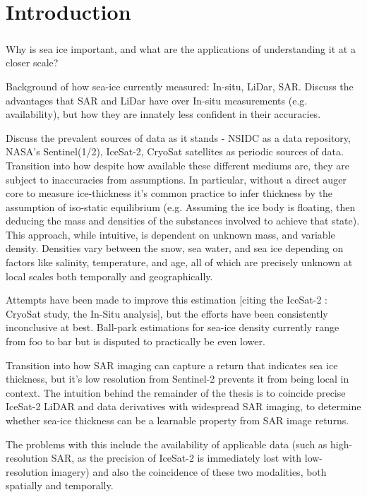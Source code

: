\chapter{Introduction}
\label{sec:Introduction}

\paragraph{}
Why is sea ice important, and what are the applications of understanding it at a closer scale?

Background of how sea-ice currently measured: In-situ, LiDar, SAR. Discuss the advantages that SAR and LiDar have over In-situ measurements (e.g. availability), but how they are innately less confident in their accuracies.

Discuss the prevalent sources of data as it stands - NSIDC as a data repository, NASA's Sentinel(1/2), IceSat-2, CryoSat satellites as periodic sources of data. Transition into how despite how available these different mediums are, they are subject to inaccuracies from assumptions. In particular, without a direct auger core to measure ice-thickness it's common practice to infer thickness by the assumption of iso-static equilibrium (e.g. Assuming the ice body is floating, then deducing the mass and densities of the substances involved to achieve that state). This approach, while intuitive, is dependent on unknown mass, and variable density. Densities vary between the snow, sea water, and sea ice depending on factors like salinity, temperature, and age, all of which are precisely unknown at local scales both temporally and geographically.

\indent Attempts have been made to improve this estimation [citing the IceSat-2 : CryoSat study, the In-Situ analysis], but the efforts have been consistently inconclusive at best. Ball-park estimations for sea-ice density currently range from foo to bar but is disputed to practically be even lower.

Transition into how SAR imaging can capture a return that indicates sea ice thickness, but it's low resolution from Sentinel-2 prevents it from being local in context. The intuition behind the remainder of the thesis is to coincide precise IceSat-2 LiDAR and data derivatives with widespread SAR imaging, to determine whether sea-ice thickness can be a learnable property from SAR image returns.

The problems with this include the availability of applicable data (such as high-resolution SAR, as the precision of IceSat-2 is immediately lost with low-resolution imagery) and also the coincidence of these two modalities, both spatially and temporally.


